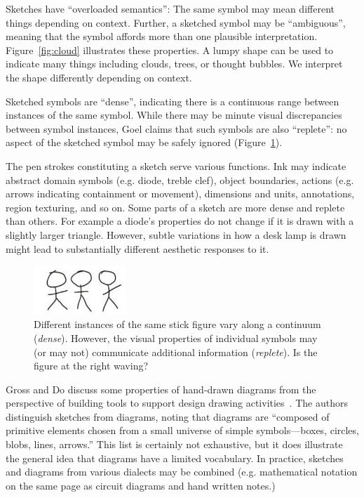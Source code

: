 Sketches have ``overloaded semantics'': The same symbol may mean
different things depending on context. Further, a sketched symbol may
be ``ambiguous'', meaning that the symbol affords more than one
plausible interpretation.  Figure~\ref{fig:cloud} illustrates these
properties. A lumpy shape can be used to indicate many things
including clouds, trees, or thought bubbles. We interpret the shape
differently depending on context.

Sketched symbols are ``dense'', indicating there is a continuous range
between instances of the same symbol. While there may be minute visual
discrepancies between symbol instances, Goel claims that such symbols
are also ``replete'': no aspect of the sketched symbol may be safely
ignored (Figure~\ref{fig:dense-replete}).

The pen strokes constituting a sketch serve various functions. Ink may
indicate abstract domain symbols (e.g. diode, treble clef), object
boundaries, actions (e.g. arrows indicating containment or movement),
dimensions and units, annotations, region texturing, and so on. Some
parts of a sketch are more dense and replete than others. For example
a diode's properties do not change if it is drawn with a slightly
larger triangle. However, subtle variations in how a desk lamp is
drawn might lead to substantially different aesthetic responses to it.

\begin{figure}
\begin{center}
  \includegraphics[angle=0, origin=c,
  width=3.5cm]{img/dense-replete-stick-figures.pdf}

  \caption{Different instances of the same stick figure vary along a
  continuum (\textit{dense}). However, the visual properties of
  individual symbols may (or may not) communicate additional
  information (\textit{replete}). Is the figure at the right waving? }

  \label{fig:dense-replete}
\end{center}
\end{figure}

Gross and Do discuss some properties of hand-drawn diagrams from the
perspective of building tools to support design drawing
activities~\cite{gross-ecn-uist}. The authors distinguish sketches
from diagrams, noting that diagrams are ``composed of primitive
elements chosen from a small universe of simple symbols---boxes,
circles, blobs, lines, arrows.'' This list is certainly not
exhaustive, but it does illustrate the general idea that diagrams have
a limited vocabulary. In practice, sketches and diagrams from various
dialects may be combined (e.g. mathematical notation on the same page
as circuit diagrams and hand written notes.)

